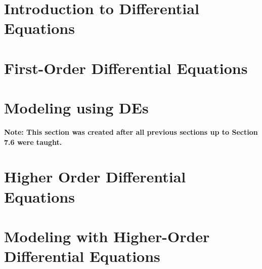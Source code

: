 \documentclass[title={MATH 252 - Introduction to Differential Equations Notes}]{math252notes}
\begin{document}
\maketitle
\tableofcontents

\chapter[Introduction to Diff-Eq]{Introduction to Differential Equations}\label{ch:introduction-to-differential-equations}

\chapter{First-Order Differential Equations}\label{ch:first-order-differential-equations}

\chapter{Modeling using DE{s}}\label{ch:modeling-using-des}
\textbf{{\Large Note: This section was created after all previous sections up to Section 7.6 were taught.}}

\chapter[Higher Order DE{s}]{Higher Order Differential Equations}\label{ch:higher-order-differential-equations}

\chapter[Modeling with Higher-Order DEs]{Modeling with Higher-Order Differential Equations}\label{ch:modeling-with-higher-order-differential-equations}
\end{document}
